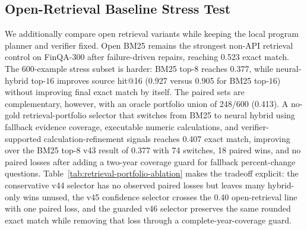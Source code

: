 \documentclass[letterpaper]{article}
\begin{document}
\begin{table}[t]
\centering
\scriptsize
\setlength{\tabcolsep}{2.5pt}
\caption{Baseline ladder on the FinQA-600 submission component-closure subset. Sup. denotes verifier-checked answer support. Source rerank uses the provided source document as an analysis setting. GPT-5.4 Direct RAG is reported separately as an API-backed FinQA-300 sanity check; verifier diagnostics show that high exact match does not necessarily imply high cited support.}
\label{tab:baseline-ladder}
\end{table}

\subsection{Open-Retrieval Baseline Stress Test}

We additionally compare open retrieval variants while keeping the local program planner and verifier fixed.
Open BM25 remains the strongest non-API retrieval control on FinQA-300 after failure-driven repairs, reaching 0.523 exact match.
The 600-example stress subset is harder: BM25 top-\(8\) reaches 0.377, while neural-hybrid top-\(16\) improves source hit@16 (0.927 versus 0.905 for BM25 top-\(16\)) without improving final exact match by itself.
The paired sets are complementary, however, with an oracle portfolio union of 248/600 (0.413).
A no-gold retrieval-portfolio selector that switches from BM25 to neural hybrid using fallback evidence coverage, executable numeric calculations, and verifier-supported calculation-refinement signals reaches 0.407 exact match, improving over the BM25 top-8 v43 result of 0.377 with 74 switches, 18 paired wins, and no paired losses after adding a two-year coverage guard for fallback percent-change questions.
Table~\ref{tab:retrieval-portfolio-ablation} makes the tradeoff explicit: the conservative v44 selector has no observed paired losses but leaves many hybrid-only wins unused, the v45 confidence selector crosses the 0.40 open-retrieval line with one paired loss, and the guarded v46 selector preserves the same rounded exact match while removing that loss through a complete-year-coverage guard.
\end{document}
